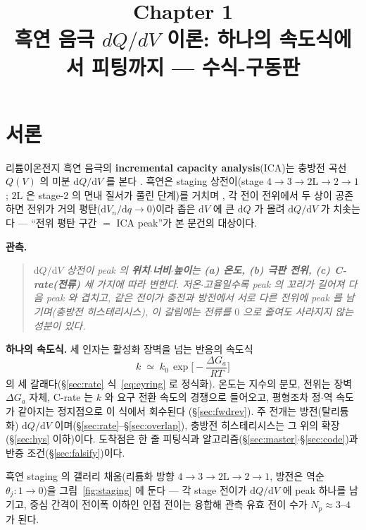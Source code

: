 \documentclass[11pt,a4paper]{article}
\title{\textbf{\LARGE Chapter 1}\\[0.35em]\Large 흑연 음극 $dQ/dV$ 이론: 하나의 속도식에서 피팅까지 — 수식-구동판}
\author{}
\date{}
\newcommand{\dd}{\mathrm{d}}
\begin{document}
\maketitle

\section*{서론}
리튬이온전지 흑연 음극의 \textbf{incremental capacity analysis}(ICA)는 충방전 곡선 $Q(V)$ 의 미분
$\dd Q/\dd V$ 를 본다 \cite{bloom2005,dubarry2012}. 흑연은 staging 상전이(stage
$4\!\to\!3\!\to\!2\mathrm L\!\to\!2\!\to\!1$; $2\mathrm L$ 은 stage-2 의 면내 질서가 풀린 단계)를 거치며
\cite{dahn1991,ohzuku1993,funabiki1999}, 각 전이 전위에서 두 상이 공존하면 전위가 거의 평탄($\dd V_n/\dd q\to0$)이라
좁은 $\dd V$ 에 큰 $\dd Q$ 가 몰려 $\dd Q/\dd V$ 가 치솟는다 — ``전위 평탄 구간 $=$ ICA peak''가 본 문건의 대상이다.

\textbf{관측.}
\begin{quote}\itshape
$\dd Q/\dd V$ 상전이 peak 의 \textbf{위치$\cdot$너비$\cdot$높이}는 \textbf{(a) 온도, (b) 극판 전위, (c) C-rate(전류)}
세 가지에 따라 변한다. 저온$\cdot$고율일수록 peak 의 꼬리가 길어져 다음 peak 와 겹치고, 같은 전이가 충전과 방전에서 서로 다른
전위에 peak 를 남기며(충방전 히스테리시스), 이 갈림에는 전류를 $0$ 으로 줄여도 사라지지 않는 성분이 있다.
\end{quote}

\textbf{하나의 속도식.} 세 인자는 활성화 장벽을 넘는 반응의 속도식
\begin{equation*}
k\;\simeq\;k_0\,\exp\!\Big[-\frac{\Delta G_a}{RT}\Big]
\end{equation*}
의 세 갈래다(\S\ref{sec:rate} 식~\eqref{eq:eyring} 로 정식화). 온도는 지수의 분모, 전위는 장벽 $\Delta G_a$ 자체,
C-rate 는 $k$ 와 요구 전환 속도의 경쟁으로 들어오고, 평형조차 정$\cdot$역 속도가 같아지는 정지점으로 이 식에서 회수된다
(\S\ref{sec:fwdrev}). 주 전개는 방전(탈리튬화) $\dd Q/\dd V$ 이며(\S\ref{sec:rate}--\S\ref{sec:overlap}), 충방전 히스테리시스는
그 위의 확장(\S\ref{sec:hys} 이하)이다. 도착점은 한 줄 피팅식과 알고리즘(\S\ref{sec:master}$\cdot$\S\ref{sec:code})과
반증 조건(\S\ref{sec:falsify})이다.

흑연 staging 의 갤러리 채움(리튬화 방향 $4\to3\to2\mathrm L\to2\to1$, 방전은 역순 $\theta_j:1\to0$)을 그림~\ref{fig:staging}
에 둔다 — 각 stage 전이가 $\dd Q/\dd V$ 에 peak 하나를 남기고, 중심 간격이 전이폭 이하인 인접 전이는 융합해 관측 유효 전이 수가
$N_p\approx3$--$4$ 가 된다.
\end{document}
